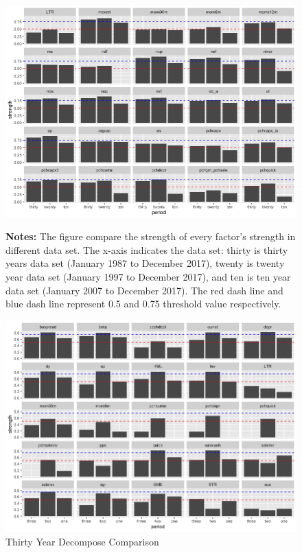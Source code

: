 \begin{landscape}
	\begin{figure}[ht]
		\includegraphics[scale = 0.75]{strength_comparison_IV}
		\centering
		\begin{minipage}{\textwidth}
			{\footnotesize {\bf Notes:} The figure compare the strength of every factor's strength in different data set. The x-axis indicates the data set: thirty is thirty years data set (January 1987 to December 2017), twenty is twenty year data set (January 1997 to December 2017), and ten is ten year data set (January 2007 to December 2017). The red dash line and blue dash line represent 0.5 and 0.75 threshold value respectively.}
		\end{minipage}
	\end{figure}
\end{landscape}

\begin{landscape}
	\begin{figure}[ht]
		\centering
		\caption{Thirty Year Decompose Comparison}\label{figure:thirty_decompose}
		\includegraphics[scale = 0.75]{thirty_decompose_I}
	\end{figure}
\end{landscape}


